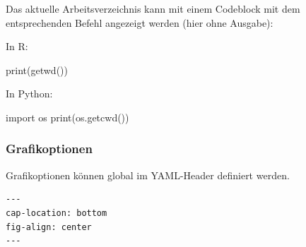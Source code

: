 \documentclass[
  letterpaper,
  DIV=11]{scrartcl}
\newenvironment{Shaded}{\begin{snugshade}}{\end{snugshade}}
\newcommand{\BuiltInTok}[1]{\textcolor[rgb]{0.00,0.23,0.31}{#1}}
\newcommand{\FunctionTok}[1]{\textcolor[rgb]{0.28,0.35,0.67}{#1}}
\newcommand{\ImportTok}[1]{\textcolor[rgb]{0.00,0.46,0.62}{#1}}
\newcommand{\NormalTok}[1]{\textcolor[rgb]{0.00,0.23,0.31}{#1}}
\begin{document}
\begin{tcolorbox}[enhanced jigsaw, rightrule=.15mm, bottomtitle=1mm, left=2mm, coltitle=black, opacitybacktitle=0.6, breakable, leftrule=.75mm, opacityback=0, colframe=quarto-callout-tip-color-frame, toprule=.15mm, toptitle=1mm, titlerule=0mm, colbacktitle=quarto-callout-tip-color!10!white, colback=white, title=\textcolor{quarto-callout-tip-color}{\faLightbulb}\hspace{0.5em}{Arbeitsverzeichnis ermitteln}, arc=.35mm, bottomrule=.15mm]

Das aktuelle Arbeitsverzeichnis kann mit einem Codeblock mit dem
entsprechenden Befehl angezeigt werden (hier ohne Ausgabe):

In R:

\begin{Shaded}
\begin{Highlighting}[]
\FunctionTok{print}\NormalTok{(}\FunctionTok{getwd}\NormalTok{())}
\end{Highlighting}
\end{Shaded}

In Python:

\begin{Shaded}
\begin{Highlighting}[]
\ImportTok{import}\NormalTok{ os}
\BuiltInTok{print}\NormalTok{(os.getcwd())}
\end{Highlighting}
\end{Shaded}

\end{tcolorbox}

\subsubsection{Grafikoptionen}\label{grafikoptionen}

Grafikoptionen können global im YAML-Header definiert werden.

\begin{verbatim}
---
cap-location: bottom
fig-align: center
---
\end{verbatim}
\end{document}
